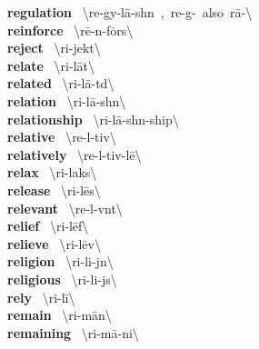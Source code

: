 \documentclass[10pt,a4paper]{article}
\begin{document}
\begin{multicols}{2}
\textbf{ regulation }\quad \ \textbackslash \textsecstress re-gy\textschwa -\textprimstress l\={a}-sh\textschwa n\ ,\ \textsecstress re-g\textschwa -\ also\ \textsecstress r\={a}-\textbackslash \\
\textbf{ reinforce }\quad \ \textbackslash \textsecstress r\={e}-\textschwa n-\textprimstress f\.{o}rs\textbackslash \\
\textbf{ reject }\quad \ \textbackslash ri-\textprimstress jekt\textbackslash \\
\textbf{ relate }\quad \ \textbackslash ri-\textprimstress l\={a}t\textbackslash \\
\textbf{ related }\quad \ \textbackslash ri-\textprimstress l\={a}-t\textschwa d\textbackslash \\
\textbf{ relation }\quad \ \textbackslash ri-\textprimstress l\={a}-sh\textschwa n\textbackslash \\
\textbf{ relationship }\quad \ \textbackslash ri-\textprimstress l\={a}-sh\textschwa n-\textsecstress ship\textbackslash \\
\textbf{ relative }\quad \ \textbackslash \textprimstress re-l\textschwa -tiv\textbackslash \\
\textbf{ relatively }\quad \ \textbackslash \textprimstress re-l\textschwa -tiv-l\={e}\textbackslash \\
\textbf{ relax }\quad \ \textbackslash ri-\textprimstress laks\textbackslash \\
\textbf{ release }\quad \ \textbackslash ri-\textprimstress l\={e}s\textbackslash \\
\textbf{ relevant }\quad \ \textbackslash \textprimstress re-l\textschwa -v\textschwa nt\textbackslash \\
\textbf{ relief }\quad \ \textbackslash ri-\textprimstress l\={e}f\textbackslash \\
\textbf{ relieve }\quad \ \textbackslash ri-\textprimstress l\={e}v\textbackslash \\
\textbf{ religion }\quad \ \textbackslash ri-\textprimstress li-j\textschwa n\textbackslash \\
\textbf{ religious }\quad \ \textbackslash ri-\textprimstress li-j\textschwa s\textbackslash \\
\textbf{ rely }\quad \ \textbackslash ri-\textprimstress l\={i}\textbackslash \\
\textbf{ remain }\quad \ \textbackslash ri-\textprimstress m\={a}n\textbackslash \\
\textbf{ remaining }\quad \ \textbackslash ri-\textprimstress m\={a}-ni\engma \textbackslash \\

\end{multicols}
\end{document}

